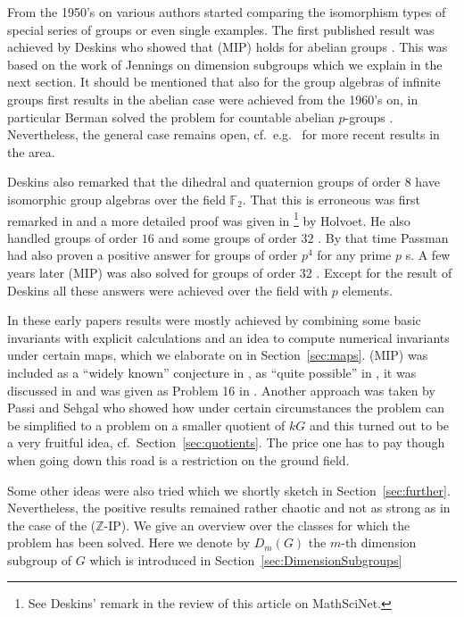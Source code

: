 \documentclass[11pt, a4paper]{amsart}
\theoremstyle{definition}
\begin{document}
From the 1950's on various authors started comparing the isomorphism types of special series of groups or even single examples. The first published result was achieved by Deskins who showed that (MIP) holds for abelian groups \cite{Deskins56}. This was based on the work of Jennings on dimension subgroups which we explain in the next section.  It should be mentioned that also for the group algebras of infinite groups first results in the abelian case were achieved from the 1960's on, in particular Berman solved the problem for countable abelian $p$-groups \cite{Berman67}. Nevertheless, the general case remains open, cf.\ e.g.\ \cite{May14} for more recent results in the area.

Deskins also remarked that the dihedral and quaternion groups of order $8$ have isomorphic group algebras over the field $\mathbb{F}_2$. That this is erroneous was first remarked in \cite{Coleman64} and a more detailed proof was given in \cite{Holvoet66}\footnote{See Deskins' remark in the review of this article on MathSciNet.} by Holvoet. He also handled groups of order $16$ \cite{Holvoet68} and some groups of order $32$ \cite{Holvoet69}. By that time Passman had also proven a positive answer for groups of order $p^4$ for any prime $p$ \cite{Passmanp4}s. A few years later (MIP) was also solved for groups of order $32$ \cite{Makasikis}. Except for the result of Deskins all these answers were achieved over the field with $p$ elements.

In these early papers results were mostly achieved by combining some basic invariants with explicit calculations and an idea to compute numerical invariants under certain maps, which we elaborate on in Section~\ref{sec:maps}. (MIP) was included as a ``widely known'' conjecture in \cite{ZalesskiiMihalev73}, as ``quite possible'' in \cite{PassmanSurvey74}, it was discussed in \cite{BovdiBook74} and was given as Problem 16 in \cite{Sehgal78}. Another approach was taken by Passi and Sehgal who showed how under certain circumstances the problem can be simplified to a problem on a smaller quotient of $kG$ \cite{PassiSehgal72} and this turned out to be a very fruitful idea, cf.\ Section~\ref{sec:quotients}. The price one has to pay though when going down this road is a restriction on the ground field.

Some other ideas were also tried which we shortly sketch in Section~\ref{sec:further}. Nevertheless, the positive results remained rather chaotic and not as strong as in the case of the ($\mathbb{Z}$-IP).
We give an overview over the classes for which the problem has been solved. Here we denote by $D_m(G)$ the $m$-th dimension subgroup of $G$ which is introduced in Section~\ref{sec:DimensionSubgroups}
\end{document}
